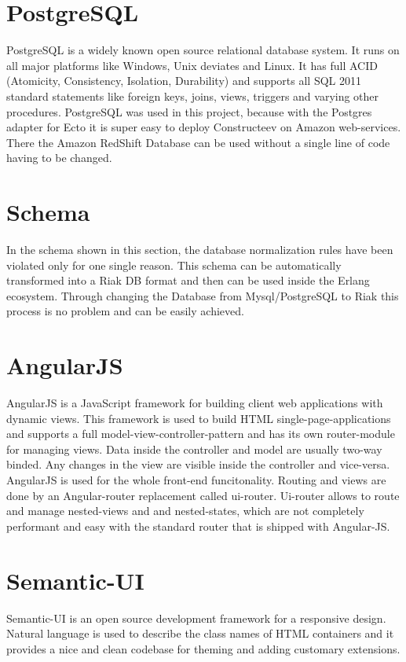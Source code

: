 \section{PostgreSQL}
PostgreSQL is a widely known open source relational database system. It runs on all major platforms like Windows, Unix deviates and Linux. It has full ACID (Atomicity, Consistency, Isolation, Durability) and supports all SQL 2011 standard statements like foreign keys, joins, views, triggers and varying other procedures.
 \textcolor{newcode}{PostgreSQL was used in this project, because with the Postgres adapter for Ecto it is super easy to deploy Constructeev on Amazon web-services. There the Amazon RedShift Database can be used without a single line of code having to be changed.}

\section{Schema}
In the schema shown in this section, the database normalization rules have been violated only for one single reason. This schema can be automatically transformed into a Riak DB format and then can be used inside the Erlang ecosystem. Through changing the Database from Mysql/PostgreSQL to Riak this process is no problem and can be easily achieved.

\section{AngularJS}
AngularJS is a JavaScript framework for building client web applications with dynamic views. This framework is used to build HTML single-page-applications and supports a full model-view-controller-pattern and has its own router-module for managing views. Data inside the controller and model are usually two-way binded. Any changes in the view are visible inside the controller and vice-versa.
\textcolor{newcode}{AngularJS is used for the whole front-end funcitonality. Routing and views are done by an Angular-router replacement called ui-router. Ui-router allows to route and manage nested-views and and nested-states, which are not completely performant and easy with the standard router that is shipped with Angular-JS.}

\section{Semantic-UI}
Semantic-UI is an open source development framework for a responsive design. Natural language is used to describe the class names of HTML containers and it provides a nice and clean codebase for theming and adding customary extensions. 

